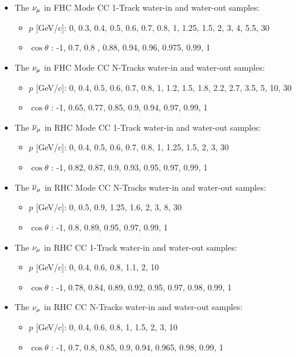 \begin{itemize}
\item The $\nu_{\mu}$ in FHC Mode CC 1-Track water-in and water-out samples:
\begin{itemize}
\item $p$ {[}GeV/c{]}: 0, 0.3, 0.4, 0.5, 0.6, 0.7, 0.8, 1, 1.25, 1.5, 2,
3, 4, 5.5, 30
\item $\cos\theta$ : -1, 0.7, 0.8 , 0.88, 0.94, 0.96, 0.975, 0.99, 1
\end{itemize}
\item The $\nu_{\mu}$ in FHC Mode CC N-Tracks water-in and water-out samples:
\begin{itemize}
\item $p$ {[}GeV/c{]}: 0, 0.4, 0.5, 0.6, 0.7, 0.8, 1, 1.2, 1.5, 1.8, 2.2,
2.7, 3.5, 5, 10, 30
\item $\cos\theta$ : -1, 0.65, 0.77, 0.85, 0.9, 0.94, 0.97, 0.99, 1
\end{itemize}
\item The $\overline{\nu}_{\mu}$ in RHC Mode CC 1-Track water-in and water-out samples:
\begin{itemize}
\item $p$ {[}GeV/c{]}: 0, 0.4, 0.5, 0.6, 0.7, 0.8, 1, 1.25, 1.5, 2, 3,
30
\item $\cos\theta$ : -1, 0.82, 0.87, 0.9, 0.93, 0.95, 0.97, 0.99, 1
\end{itemize}
\item The $\overline{\nu}_{\mu}$ in RHC Mode CC N-Tracks water-in and water-out samples:
\begin{itemize}
\item $p$ {[}GeV/c{]}: 0, 0.5, 0.9, 1.25, 1.6, 2, 3, 8, 30
\item $\cos\theta$ : -1, 0.8, 0.89, 0.95, 0.97, 0.99, 1
\end{itemize}
\item The $\nu_{\mu}$ in RHC CC 1-Track water-in and water-out samples:
\begin{itemize}
\item $p$ {[}GeV/c{]}: 0, 0.4, 0.6, 0.8, 1.1, 2, 10
\item $\cos\theta$ : -1, 0.78, 0.84, 0.89, 0.92, 0.95, 0.97, 0.98, 0.99,
1
\end{itemize}
\item The $\nu_{\mu}$ in RHC CC N-Tracks water-in and water-out samples:
\begin{itemize}
\item $p$ {[}GeV/c{]}: 0, 0.4, 0.6, 0.8, 1, 1.5, 2, 3, 10
\item $\cos\theta$ : -1, 0.7, 0.8, 0.85, 0.9, 0.94, 0.965, 0.98, 0.99,
1
\end{itemize}
\end{itemize}
%


